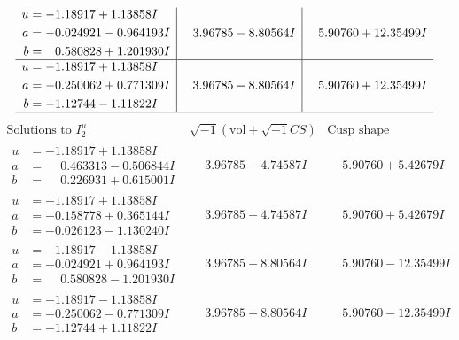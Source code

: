 \documentclass[1p]{elsarticle_modified}
\theoremstyle{definition}
\newcommand{\I}{\sqrt{-1}}
\begin{document}
$$\begin{array}{c|c|c}
\begin{aligned}
u &= -1.18917 + 1.13858 I \\
a &= -0.024921 - 0.964193 I \\
b &= \phantom{-}0.580828 + 1.201930 I\end{aligned}
 & \phantom{-}3.96785 - 8.80564 I & \phantom{-}5.90760 + 12.35499 I \\ \hline\begin{aligned}
u &= -1.18917 + 1.13858 I \\
a &= -0.250062 + 0.771309 I \\
b &= -1.12744 - 1.11822 I\end{aligned}
 & \phantom{-}3.96785 - 8.80564 I & \phantom{-}5.90760 + 12.35499 I\\
 \hline 
 \end{array}$$\newpage$$\begin{array}{c|c|c}  
\text{Solutions to }I^u_{2}& \I (\text{vol} + \sqrt{-1}CS) & \text{Cusp shape}\\
 \hline 
\begin{aligned}
u &= -1.18917 + 1.13858 I \\
a &= \phantom{-}0.463313 - 0.506844 I \\
b &= \phantom{-}0.226931 + 0.615001 I\end{aligned}
 & \phantom{-}3.96785 - 4.74587 I & \phantom{-}5.90760 + 5.42679 I \\ \hline\begin{aligned}
u &= -1.18917 + 1.13858 I \\
a &= -0.158778 + 0.365144 I \\
b &= -0.026123 - 1.130240 I\end{aligned}
 & \phantom{-}3.96785 - 4.74587 I & \phantom{-}5.90760 + 5.42679 I \\ \hline\begin{aligned}
u &= -1.18917 - 1.13858 I \\
a &= -0.024921 + 0.964193 I \\
b &= \phantom{-}0.580828 - 1.201930 I\end{aligned}
 & \phantom{-}3.96785 + 8.80564 I & \phantom{-}5.90760 - 12.35499 I \\ \hline\begin{aligned}
u &= -1.18917 - 1.13858 I \\
a &= -0.250062 - 0.771309 I \\
b &= -1.12744 + 1.11822 I\end{aligned}
 & \phantom{-}3.96785 + 8.80564 I & \phantom{-}5.90760 - 12.35499 I \\ \hline\begin{aligned}

\end{aligned}
\end{array}$$
\end{document}
